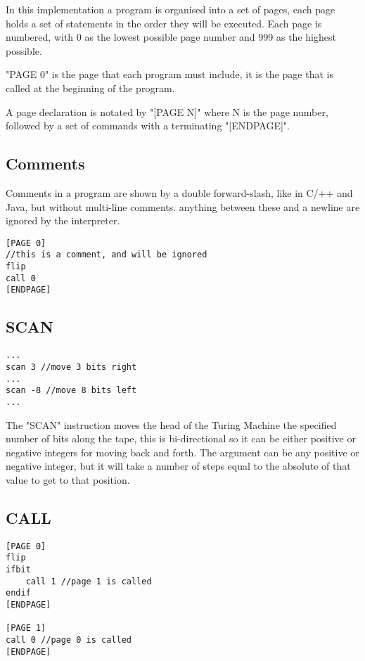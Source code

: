 \documentclass[11pt]{article}
\begin{document}
In this implementation a program is organised into a set of pages, each page holds a set of statements in the order they will be executed. Each page is numbered, with 0 as the lowest possible page number and 999 as the highest possible.

"PAGE 0" is the page that each program must include, it is the page that is called at the beginning of the program.

A page declaration is notated by "[PAGE N]" where N is the page number, followed by a set of commands with a terminating "[ENDPAGE]".\linebreak

\subsection{Comments}

Comments in a program are shown by a double forward-slash, like in C/++ and Java, but without multi-line comments. anything between these and a newline are ignored by the interpreter.

\begin{lstlisting}
[PAGE 0]
//this is a comment, and will be ignored
flip
call 0
[ENDPAGE]
\end{lstlisting}

\subsection{SCAN}

\begin{lstlisting}
...
scan 3 //move 3 bits right
...
scan -8 //move 8 bits left
...
\end{lstlisting}

The "SCAN" instruction moves the head of the Turing Machine the specified number of bits along the tape, this is bi-directional so it can be either positive or negative integers for moving back and forth. The argument can be any positive or negative integer, but it will take a number of steps equal to the absolute of that value to get to that position.\linebreak

\subsection{CALL}

\begin{lstlisting}
[PAGE 0]
flip
ifbit
	call 1 //page 1 is called
endif
[ENDPAGE]

[PAGE 1]
call 0 //page 0 is called
[ENDPAGE]
\end{lstlisting}
\end{document}
